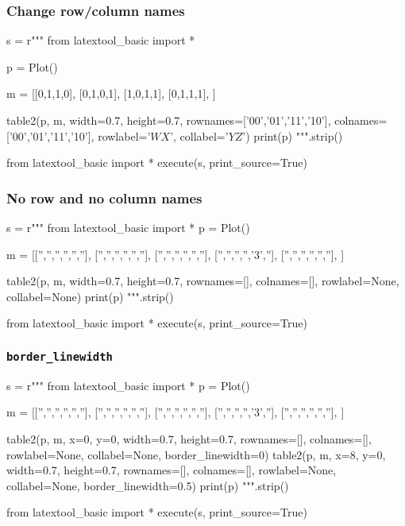\newpage
\subsubsection{Change row/column names}

\begin{python}
s = r"""
from latextool_basic import *

p = Plot()

m = [[0,1,1,0],
     [0,1,0,1],
     [1,0,1,1],
     [0,1,1,1],
     ]

table2(p, m, width=0.7, height=0.7,
       rownames=['00','01','11','10'],
       colnames=['00','01','11','10'],
       rowlabel='$WX$', collabel='$YZ$')      
print(p)
""".strip()

from latextool_basic import *
execute(s, print_source=True)
\end{python}





\newpage
\subsubsection{No row and no column names}

\begin{python}
s = r"""
from latextool_basic import *
p = Plot()

m = [['','','','','',''],
     ['','','','','',''],
     ['','','','','',''],
     ['','','','','3',''],
     ['','','','','',''],
     ]

table2(p, m, width=0.7, height=0.7,
       rownames=[],
       colnames=[],
       rowlabel=None, collabel=None)
print(p)
""".strip()

from latextool_basic import *
execute(s, print_source=True)
\end{python}



\newpage\subsubsection{\texttt{border\_linewidth}}

\begin{python}
s = r"""
from latextool_basic import *
p = Plot()

m = [['','','','','',''],
     ['','','','','',''],
     ['','','','','',''],
     ['','','','','3',''],
     ['','','','','',''],
     ]

table2(p, m, x=0, y=0, width=0.7, height=0.7,
       rownames=[],
       colnames=[],
       rowlabel=None, collabel=None, border_linewidth=0)
table2(p, m, x=8, y=0, width=0.7, height=0.7,
       rownames=[],
       colnames=[],
       rowlabel=None, collabel=None, border_linewidth=0.5)
print(p)
""".strip()

from latextool_basic import *
execute(s, print_source=True)
\end{python}





